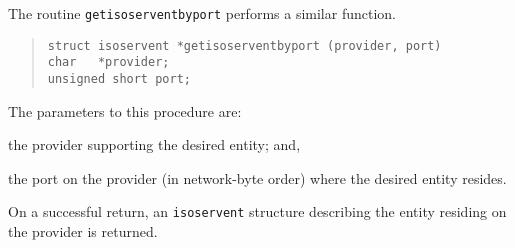 The routine \verb"getisoserventbyport" performs a similar function.
\begin{quote}\small\begin{verbatim}
struct isoservent *getisoserventbyport (provider, port)
char   *provider;
unsigned short port;
\end{verbatim}\end{quote}
The parameters to this procedure are:
\begin{describe}
\item[\verb"provider":] the provider supporting the desired entity;
and,

\item[\verb"port":] the port on the provider (in network-byte order)
where the desired entity resides.
\end{describe}
On a successful return,
an \verb"isoservent" structure describing the entity residing on the provider
is returned.
